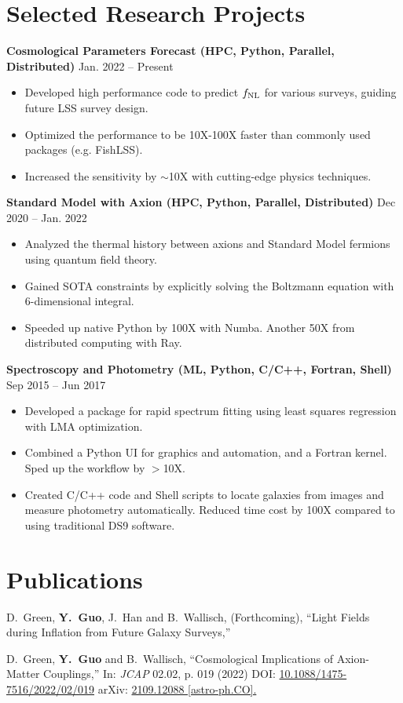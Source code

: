 \documentclass[letterpaper,12pt]{article}
\newenvironment{zitemize}{
\begin{itemize} \vspace{-.8em}\itemsep 0pt \parskip 0pt}
{\end{itemize}\vspace{-.7em}}
\newcommand{\proglang}[1]{#1}
\begin{document}
\section{Selected Research Projects}
\textbf{Cosmological Parameters Forecast (HPC, Python, Parallel, Distributed)} \hfill Jan. 2022 -- Present \\
\begin{zitemize}
    \item Developed high performance code to predict $f_{\rm NL}$ for various surveys, guiding future LSS survey design.
    \item Optimized the performance to be 10X-100X faster than commonly used packages (e.g. FishLSS).
    \item Increased the sensitivity by $\sim$10X with cutting-edge physics techniques.
\end{zitemize}

\textbf{Standard Model with Axion (HPC, Python, Parallel, Distributed)} \hfill Dec 2020 -- Jan. 2022 \\
\begin{zitemize}
    \item Analyzed the thermal history between axions and Standard Model fermions using quantum field theory. 
    \item Gained SOTA constraints by explicitly solving the Boltzmann equation with 6-dimensional integral.
    \item Speeded up native \proglang{Python} by 100X with \proglang{Numba}. Another 50X from distributed computing with \proglang{Ray}.
\end{zitemize}

\textbf{Spectroscopy and Photometry (ML, Python, C/C++, Fortran, Shell)} \hfill Sep 2015 -- Jun 2017 \\
\begin{zitemize}
    \item Developed a package for rapid spectrum fitting using least squares regression with LMA optimization.
    \item Combined a \proglang{Python} UI for graphics and automation, and a \proglang{Fortran} kernel. Sped up the workflow by $>$10X. 
    \item Created \proglang{C/C++} code and \proglang{Shell} scripts to locate galaxies from images and measure photometry automatically. Reduced time cost by 100X compared to using traditional DS9 software.
\end{zitemize}


\section{Publications}

D.~Green, \textbf{Y.~Guo}, J.~Han and B.~Wallisch, (Forthcoming),
``Light Fields during Inflation from Future Galaxy Surveys,''

D.~Green, \textbf{Y.~Guo} and B.~Wallisch,
``Cosmological Implications of Axion-Matter Couplings,''
In: \textit{JCAP} 02.02, p. 019 (2022)
DOI: \href{https://iopscience.iop.org/article/10.1088/1475-7516/2022/02/019}{10.1088/1475-7516/2022/02/019}
arXiv: \href{https://arxiv.org/abs/2109.12088?context=hep-ph}{2109.12088 [astro-ph.CO].}
\end{document}
